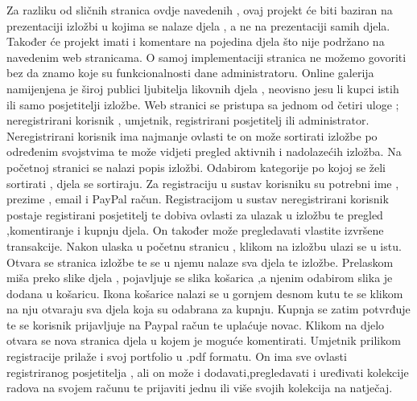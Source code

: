 		\vspace{10mm} 
			
		
		{Za razliku od sličnih stranica ovdje navedenih , ovaj projekt će biti baziran na prezentaciji izložbi u kojima se nalaze djela , a ne na prezentaciji samih djela. 
			Također će projekt 	imati i komentare na pojedina djela što nije podržano na navedenim web stranicama. O samoj implementaciji stranica ne možemo govoriti bez da znamo koje su funkcionalnosti  dane administratoru.
			\newline Online galerija namijenjena je široj publici ljubitelja likovnih djela , neovisno jesu li kupci istih ili samo posjetitelji izložbe.
			\vspace{3mm}
			\newline Web stranici se pristupa sa jednom od četiri uloge ; neregistrirani korisnik , umjetnik, registrirani posjetitelj ili administrator. Neregistrirani korisnik ima najmanje ovlasti te on može  sortirati izložbe po određenim svojstvima te može vidjeti pregled aktivnih i nadolazećih izložba. 
			\newline Na početnoj stranici se nalazi popis izložbi. Odabirom kategorije po kojoj se želi sortirati , djela se sortiraju.
			\newline Za registraciju u sustav korisniku su potrebni ime , prezime , email i PayPal račun.
			\vspace{3mm}
			\newline Registracijom u sustav neregistrirani korisnik postaje registirani posjetitelj te dobiva ovlasti za ulazak u izložbu te pregled ,komentiranje i kupnju djela. On također može  pregledavati vlastite izvršene transakcije.
			\newline Nakon ulaska u početnu stranicu , klikom na izložbu ulazi se u istu. Otvara se stranica izložbe te se u njemu nalaze sva djela te izložbe.
			\newline Prelaskom miša preko slike djela , pojavljuje se slika košarica ,a njenim odabirom slika je dodana u košaricu. Ikona košarice nalazi se u gornjem desnom kutu te se klikom na nju  otvaraju sva djela koja su odabrana za kupnju. Kupnja se zatim potvrđuje te se korisnik prijavljuje na Paypal račun te uplaćuje novac. 
			\newline Klikom na djelo otvara se nova stranica djela u kojem je moguće komentirati. 
			\vspace{3mm}
			\newline Umjetnik prilikom registracije prilaže i svoj portfolio u .pdf formatu. On ima sve ovlasti registriranog posjetitelja , ali on može i dodavati,pregledavati i uređivati kolekcije radova na  svojem računu te prijaviti jednu ili više svojih kolekcija na natječaj.
}
